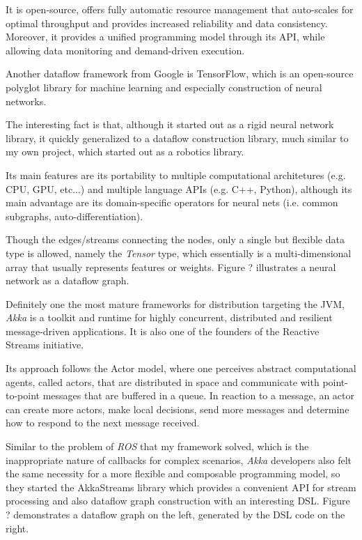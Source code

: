 \documentclass{dithesis}
\begin{document}
It is open-source, offers fully automatic resource management that auto-scales for optimal throughput and provides increased reliability and data consistency. Moreover, it provides a unified programming model through its API, while allowing data monitoring and demand-driven execution.


Another dataflow framework from Google is TensorFlow, which is an open-source polyglot library for machine learning and especially construction of neural networks.

The interesting fact is that, although it started out as a rigid neural network library, it quickly generalized to a dataflow construction library, much similar to my own project, which started out as a robotics library. 

Its main features are its portability to multiple computational architetures (e.g. CPU, GPU, etc...) and multiple language APIs (e.g. C++, Python), although its main advantage are its domain-specific operators for neural nets (i.e. common subgraphs, auto-differentiation).

Though the edges/streams connecting the nodes, only a single but flexible data type is allowed, namely the \textit{Tensor} type, which essentially is a multi-dimensional array that usually represents features or weights. Figure ? illustrates a neural network as a dataflow graph.



Definitely one the most mature frameworks for distribution targeting the JVM, \textit{Akka} is a toolkit and runtime for highly concurrent, distributed and resilient message-driven applications. It is also one of the founders of the Reactive Streams\cite{rss} initiative.

Its approach follows the Actor model\cite{actor}, where one perceives abstract computational agents, called actors, that are distributed in space and communicate with point-to-point messages that are buffered in a queue. In reaction to a message, an actor can create more actors, make local decisions, send more messages and determine how to respond to the next message received.

Similar to the problem of \textit{ROS} that my framework solved, which is the inappropriate nature of callbacks for complex scenarios, \textit{Akka} developers also felt the same necessity for a more flexible and composable programming model, so they started the AkkaStreams library which provides a convenient API for stream processing and also dataflow graph construction with an interesting DSL. Figure ? demonstrates a dataflow graph on the left, generated by the DSL code on the right.
\end{document}
